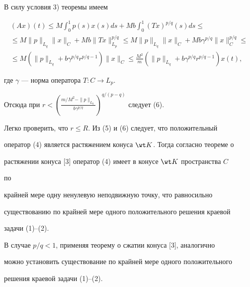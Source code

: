 \begin{pf}
В силу условия 3) теоремы имеем 


\begin{multline*} 


(Ax)(t)\le M\int^1_0p(s)x(s)ds+Mb\int^1_0 (Tx)^{p/q}(s)ds\le\\ 


% 


\le M\|p\|_{L_q}\|x\|_C+Mb\|Tx\|^{p/q}_{L_p}\le 


M\|p\|_{L_q}\|x\|_C+Mb\gamma^{p/q}\|x\|^{p/q}_C\le\\ 


% 


\le M(\|p\|_{L_q}+b\gamma^{p/q}r^{p/q-1})\|x\|_C\le 


\frac{M^2}{m}(\|p\|_{L_q}+b\gamma^{p/q}r^{p/q-1})x(t), 


\end{multline*} 


где $\gamma$ --- норма оператора $T:C\to L_p$. 


 


Отсюда при $r<\left(\frac{m/M^2-\|p\|_{L_q}} 


{b\gamma^{p/q}}\right)^{q/(p-q)}$ следует (6). 


 


Легко проверить, что $r\le R$. Из (5) и (6) следует, что положительный 


оператор (4) является растяжением конуса $\wt K$. Тогда согласно теореме о 


растяжении конуса [3] оператор (4) имеет в конусе $\wt K$ пространства $C$ 


по 


крайней мере одну ненулевую неподвижную точку, что равносильно 


существованию по крайней мере одного положительного решения краевой 


задачи (1)--(2). 


 


В случае $p/q<1$, применяя теорему о сжатии конуса [3], аналогично 


можно установить существование по крайней мере одного положительного 


решения краевой задачи (1)--(2). 


\end{pf} 


 


 



